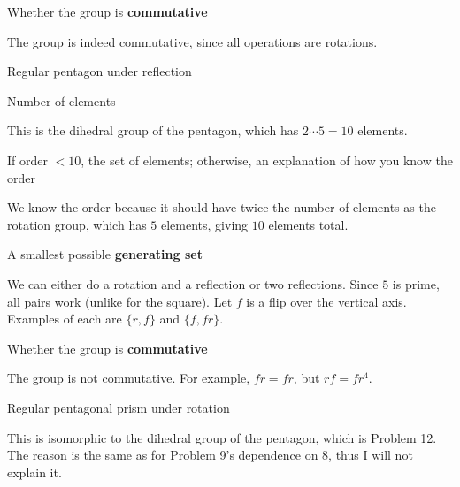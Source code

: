 \documentclass[../gatm_answers.tex]{subfiles}
\begin{document}
\begin{inner_problem}
\item Whether the group is \textbf{commutative}
\end{inner_problem}

The group is indeed commutative, since all operations are rotations.

\begin{outer_problem}
\item Regular pentagon under reflection
\end{outer_problem}

\begin{inner_problem}[start=1]
\item Number of elements
\end{inner_problem}

This is the dihedral group of the pentagon, which has $2\cdots 5=10$ elements.

\begin{inner_problem}
\item If order $< 10$, the set of elements; otherwise, an explanation of how you know the order
\end{inner_problem}

We know the order because it should have twice the number of elements as the rotation group, which has $5$ elements, giving $10$ elements total.

\begin{inner_problem}
\item A smallest possible \textbf{generating set}
\end{inner_problem}

We can either do a rotation and a reflection or two reflections. Since $5$ is prime, all pairs work (unlike for the square). Let $f$ is a flip over the vertical axis. Examples of each are $\{r,f\}$ and $\{f,fr\}$.

\begin{inner_problem}
\item Whether the group is \textbf{commutative}
\end{inner_problem}

The group is not commutative. For example, $fr=fr$, but $rf=fr^4$.

\begin{outer_problem}
\item Regular pentagonal prism under rotation
\end{outer_problem}

This is isomorphic to the dihedral group of the pentagon, which is Problem 12. The reason is the same as for Problem 9's dependence on 8, thus I will not explain it.
\end{document}
